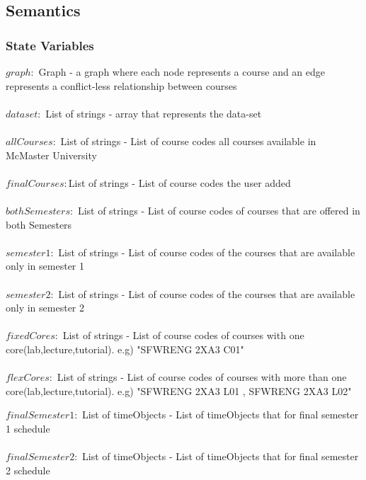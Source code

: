 \documentclass[11pt, oneside]{article}
\begin{document}
\subsection* {Semantics}
\subsubsection* {State Variables}
$graph:$ Graph - a graph where each node represents a course and an edge represents a conflict-less relationship between courses  \\ \\
$ dataset:$ List of strings - array that represents the data-set  \\ \\
$ allCourses:$ List of strings - List of  course codes all courses available in McMaster University \\ \\
$finalCourses:$List of strings - List of course codes the user added \\ \\
$bothSemesters:$ List of strings - List of course codes of courses that are offered in both Semesters \\ \\

$semester1:$ List of strings - List of course codes of the courses that are available only in semester 1 \\ \\

$semester2:$ List of strings - List of course codes of the courses that are available only in semester 2 \\ \\

$fixedCores:$ List of strings - List of course codes of courses with one core(lab,lecture,tutorial). e.g) "SFWRENG 2XA3 C01" \\ \\ 

$flexCores:$ List of strings - List of course codes of courses with more than one core(lab,lecture,tutorial). e.g) "SFWRENG 2XA3 L01 , SFWRENG 2XA3 L02" 

$finalSemester1:$ List of timeObjects - List of timeObjects that for final semester 1 schedule \\ \\ 

$finalSemester2:$ List of timeObjects - List of timeObjects that for final semester 2 schedule \\ \\ 
\end{document}
